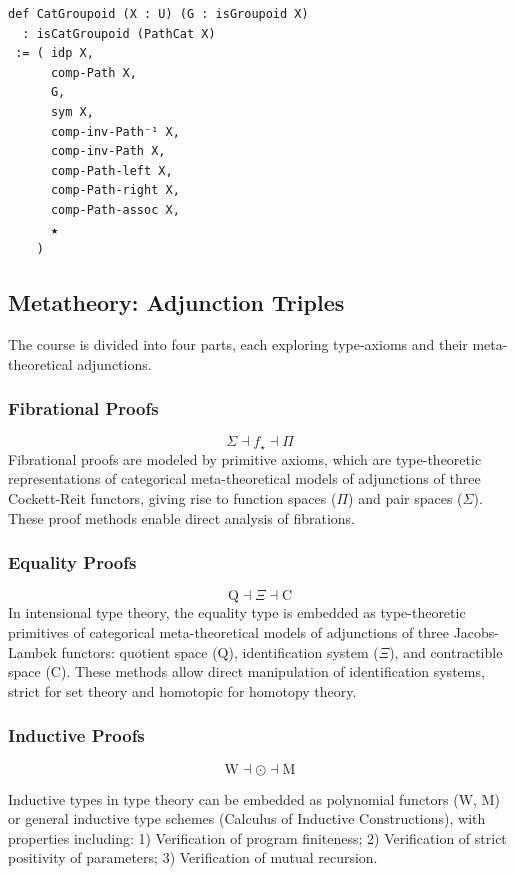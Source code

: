\documentclass{article}
\begin{document}
\begin{lstlisting}
def CatGroupoid (X : U) (G : isGroupoid X)
  : isCatGroupoid (PathCat X)
 := ( idp X,
      comp-Path X,
      G,
      sym X,
      comp-inv-Path⁻¹ X,
      comp-inv-Path X,
      comp-Path-left X,
      comp-Path-right X,
      comp-Path-assoc X,
      ★
    )
\end{lstlisting}

\newpage
\subsection{Metatheory: Adjunction Triples}
The course is divided into four parts, each exploring type-axioms and their meta-theoretical adjunctions.

\subsubsection{Fibrational Proofs}
\[
\Sigma \dashv f_\star \dashv \Pi
\]
Fibrational proofs are modeled by primitive axioms, which are type-theoretic
representations of categorical meta-theoretical models of adjunctions of three
Cockett-Reit functors, giving rise to function spaces (\(\Pi\)) and pair
spaces (\(\Sigma\)). These proof methods enable direct analysis of fibrations.

\subsubsection{Equality Proofs}
\[
\mathrm{Q} \dashv \Xi \dashv \mathrm{C}
\]
In intensional type theory, the equality type is embedded as type-theoretic
primitives of categorical meta-theoretical models of adjunctions of three
Jacobs-Lambek functors: quotient space (\(\mathrm{Q}\)), identification
system (\(\Xi\)), and contractible space (\(\mathrm{C}\)). These methods allow
direct manipulation of identification systems, strict for set theory and
homotopic for homotopy theory.

\subsubsection{Inductive Proofs}
$$
\mathrm{W} \dashv \odot \dashv \mathrm{M}
$$

Inductive types in type theory can be embedded as polynomial
functors ($\mathrm{W}$, $\mathrm{M}$) or general inductive type
schemes (Calculus of Inductive Constructions), with properties including:
1) Verification of program finiteness;
2) Verification of strict positivity of parameters;
3) Verification of mutual recursion.
\end{document}
